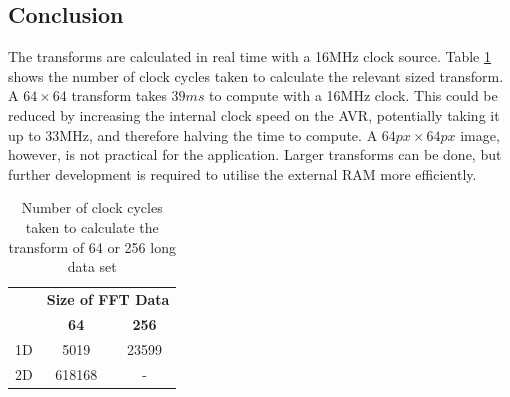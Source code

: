 \subsection{Conclusion}
The transforms are calculated in real time with a 16MHz clock source. Table \ref{table:FFTSize_Time} shows the number of clock cycles taken to calculate the relevant sized transform. A $64 \times 64$ transform takes $39ms$ to compute with a 16MHz clock. This could be reduced by increasing the internal clock speed on the AVR, potentially taking it up to 33MHz, and therefore halving the time to compute. A $64px \times 64px$ image, however, is not practical for the application. Larger transforms can be done, but further development is required to utilise the external RAM more efficiently.%

\begin{table}
\centering
\caption{Number of clock cycles taken to calculate the transform of 64 or 256 long data set}
\label{table:FFTSize_Time}
\begin{tabular}{ccc} \toprule
 	& \multicolumn{2}{c}{ \textbf{Size of FFT Data} } \\ \cmidrule{2-3}
	& 	\textbf{64} 		& 	\textbf{256} \\ \toprule
1D 	&	5019 	& 	23599		\\ \midrule
2D 	& 	618168 	& 	- 	\\ \bottomrule
\end{tabular}
\end{table}



